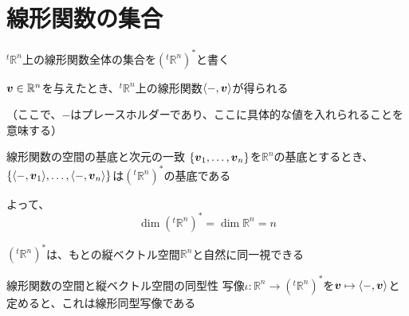 \documentclass[../../../topic_linear-algebra]{subfiles}
\begin{document}
\sectionline
\section{線形関数の集合}

${}^t\mathbb{R}^n$上の線形関数全体の集合を$({}^t\mathbb{R}^n)^*$と書く

\br

$\vb*{v} \in \mathbb{R}^n$を与えたとき、${}^t\mathbb{R}^n$上の線形関数$\langle -, \vb*{v} \rangle$が得られる

（ここで、$-$はプレースホルダーであり、ここに具体的な値を入れられることを意味する）

\begin{theorem}{線形関数の空間の基底と次元の一致}
  $\{ \vb*{v}_1,\ldots,\vb*{v}_n \}$を$\mathbb{R}^n$の基底とするとき、$\{ \langle -, \vb*{v}_1 \rangle, \ldots, \langle -, \vb*{v}_n \rangle \}$は$({}^t\mathbb{R}^n)^*$の基底である

  よって、
  \begin{equation*}
    \dim({}^t\mathbb{R}^n)^* = \dim \mathbb{R}^n = n
  \end{equation*}
\end{theorem}

\br

$({}^t\mathbb{R}^n)^*$は、もとの縦ベクトル空間$\mathbb{R}^n$と自然に同一視できる

\begin{theorem}{線形関数の空間と縦ベクトル空間の同型性}
  写像$\iota\colon \mathbb{R}^n \to ({}^t\mathbb{R}^n)^*$を$\vb*{v} \mapsto \langle -, \vb*{v} \rangle$と定めると、これは線形同型写像である
\end{theorem}
\end{document}
